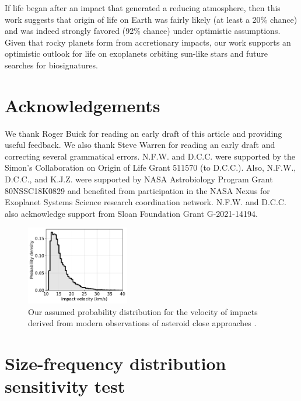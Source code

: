 \documentclass[manuscript]{aastex63}
\begin{document}
If life began after an impact that generated a reducing atmosphere, then this work suggests that origin of life on Earth was fairly likely (at least a 20\% chance) and was indeed strongly favored (92\% chance) under optimistic assumptions. Given that rocky planets form from accretionary impacts, our work supports an optimistic outlook for life on exoplanets orbiting sun-like stars and future searches for biosignatures. 

\section*{Acknowledgements}

We thank Roger Buick for reading an early draft of this article and providing useful feedback. We also thank Steve Warren for reading an early draft and correcting several grammatical errors. N.F.W. and D.C.C. were supported by the Simon's Collaboration on Origin of Life Grant 511570 (to D.C.C.). Also, N.F.W., D.C.C., and K.J.Z. were supported by NASA Astrobiology Program Grant 80NSSC18K0829 and benefited from participation in the NASA Nexus for Exoplanet Systems Science research coordination network. N.F.W. and D.C.C. also acknowledge support from Sloan Foundation Grant G-2021-14194.

\appendix

\renewcommand{\thefigure}{A\arabic{figure}}
\renewcommand{\thetable}{A\arabic{table}}
\setcounter{figure}{0}
\setcounter{table}{0}

\begin{figure}
  \centering
  \includegraphics[width=0.4\textwidth]{figures/velocity_distribution.pdf}
  \caption{Our assumed probability distribution for the velocity of impacts derived from modern observations of asteroid close approaches \citep{Park_2023}.}
  \label{fig:velocity_distribution}
\end{figure}

\section{Size-frequency distribution sensitivity test} \label{sec:append_sfd}
\end{document}
